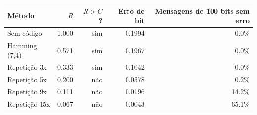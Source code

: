 \begin{tabular}{lrrrr}
\toprule
Método & $R$ & $R>C$? & Erro de bit & Mensagens de 100 bits sem erro \\
\midrule
Sem código & 1.000 & sim & 0.1994 & 0.0\% \\
Hamming (7,4) & 0.571 & sim & 0.1967 & 0.0\% \\
Repetição 3x & 0.333 & sim & 0.1042 & 0.0\% \\
Repetição 5x & 0.200 & não & 0.0578 & 0.2\% \\
Repetição 9x & 0.111 & não & 0.0196 & 14.2\% \\
Repetição 15x & 0.067 & não & 0.0043 & 65.1\% \\
\bottomrule
\end{tabular}
